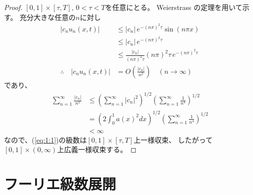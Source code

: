 \documentclass[report]{jlreq}
\begin{document}
\begin{proof}
    $[0, 1] \times [\tau, T],\, 0 < \tau < T$を任意にとる。
    Weierstrass の定理を用いて示す。
    充分大きな任意の$n$に対し
    \begin{equation}
        \begin{split}
            |c_n u_n(x, t)|
                &\le |c_n|\, e^{-(n\pi)^2 \tau} \sin (n\pi x) \\
                &\le |c_n|\, e^{-(n\pi)^2 \tau} \\
                &\le \frac{|c_n|}{(n\pi)^2 \tau} (n\pi)^2 \tau\, e^{-(n\pi)^2 \tau} \\[0.5em]
            \therefore\quad |c_n u_n(x, t)|
                &= O\left(\frac{|c_n|}{n^2}\right) \quad (n \to \infty)
        \end{split}
    \end{equation}
    であり、
    \begin{equation}
        \begin{split}
            \sum_{n = 1}^\infty \frac{|c_n|}{n^2}
                &\le \left(\sum_{n = 1}^\infty |c_n|^2\right)^{1/2}
                    \left(\sum_{n = 1}^\infty \frac{1}{n^4} \right)^{1/2} \\
                &= \left(2 \int_0^1 a(x)^2 dx\right)^{1/2}
                    \left(\sum_{n = 1}^\infty \frac{1}{n^4} \right)^{1/2} \\
                &< \infty
        \end{split}
    \end{equation}
    なので、(\ref{eq:1:1})の級数は$[0, 1] \times [\tau, T]$上一様収束、
    したがって$[0, 1] \times (0, \infty)$上広義一様収束する。
\end{proof}




%
\section{フーリエ級数展開}
\end{document}
